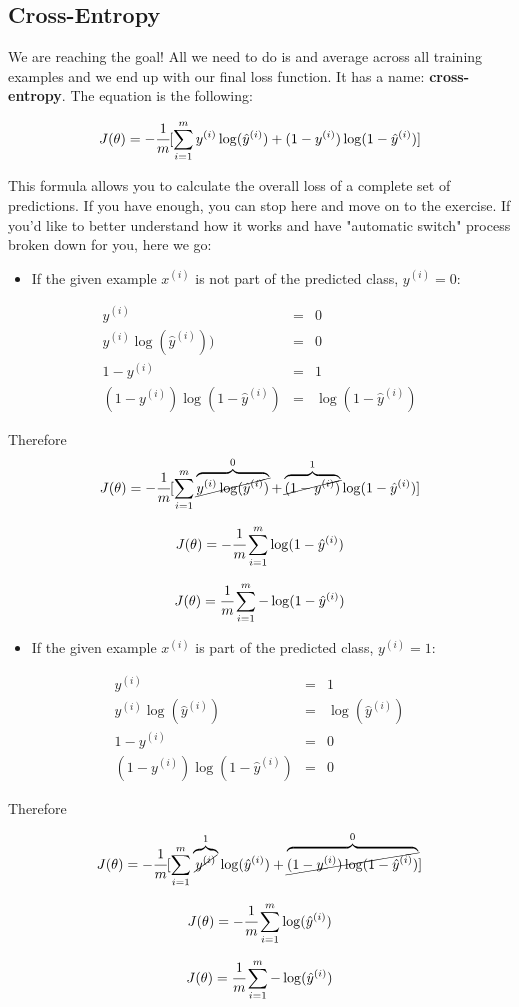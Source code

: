 \subsection*{Cross-Entropy}
We are reaching the goal!
All we need to do is and average across all training examples and we end up with our final loss function.
It has a name: \textbf{cross-entropy}. The equation is the following:  

$$
J( \theta) = -\cfrac{1} {m} \lbrack \sum_{i = 1}^{m} y^{(i)}\log(\hat{y}^{(i)}) + (1 - y^{(i)})\log(1 - \hat{y}^{(i)})\rbrack
$$

This formula allows you to calculate the overall loss of a complete set of predictions.
If you have enough, you can stop here and move on to the exercise.
If you'd like to better understand how it works and have "automatic switch" process broken down for you, here we go:

\begin{itemize}
    \item If the given example $x^{(i)}$ is not part of the predicted class, $y^{(i)} = 0$:
\end{itemize}
$$
\begin{matrix}
y^{(i)} & = & 0 \\
y^{(i)}\log(\hat{y}^{(i)})) & = & 0   \\
1 - y^{(i)} & = & 1 \\
(1 - y^{(i)})\log(1 - \hat{y}^{(i)}) & = & \log(1 - \hat{y}^{(i)})
\end{matrix}
$$

Therefore
$$
J( \theta) = -\cfrac{1} {m} \lbrack \sum_{i = 1}^{m} \overbrace{\cancel{y^{(i)}\log(\hat{y}^{(i)})}}^{0} + \overbrace{\cancel{(1 - y^{(i)})}}^{1}\log(1 - \hat{y}^{(i)})\rbrack
$$

$$
J( \theta) = -\cfrac{1} {m} \sum_{i = 1}^{m} \log(1 - \hat{y}^{(i)})
$$

$$
J( \theta) = \cfrac{1} {m} \sum_{i = 1}^{m} -\log(1 - \hat{y}^{(i)})
$$

\begin{itemize}
    \item If the given example $x^{(i)}$ is part of the predicted class, $y^{(i)} = 1$:
\end{itemize}

$$
\begin{matrix}
y^{(i)} & = & 1 \\
y^{(i)}\log(\hat{y}^{(i)}) & = & \log(\hat{y}^{(i)})\\
1 - y^{(i)} & = & 0 \\ 
(1 - y^{(i)})\log(1 - \hat{y}^{(i)}) & = & 0  
\end{matrix}
$$

Therefore

$$
J( \theta) = -\cfrac{1} {m} \lbrack \sum_{i = 1}^{m} \overbrace{\cancel{y^{(i)}}}^{1}\log(\hat{y}^{(i)}) + \overbrace{\cancel{(1 - y^{(i)})\log(1 - \hat{y}^{(i)})}}^{0}\rbrack
$$

$$
J( \theta) = -\cfrac{1} {m} \sum_{i = 1}^{m} \log(\hat{y}^{(i)})
$$

$$
J( \theta) = \cfrac{1} {m} \sum_{i = 1}^{m} -\log(\hat{y}^{(i)})
$$

